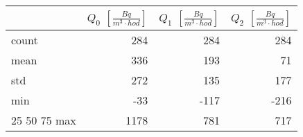 \begin{tabular}{lrrr}
\toprule
{} &  $Q_0$ $\left[\si{\frac{Bq}{m^3\cdot hod}}\right]$ &  $Q_1$ $\left[\si{\frac{Bq}{m^3\cdot hod}}\right]$ &  $Q_2$ $\left[\si{\frac{Bq}{m^3\cdot hod}}\right]$ \\
\midrule
count &                                                284 &                                                284 &                                                284 \\
mean  &                                                336 &                                                193 &                                                 71 \\
std   &                                                272 &                                                135 &                                                177 \\
min   &                                                -33 &                                               -117 &                                               -216 \\
25%
50%
75%
max   &                                               1178 &                                                781 &                                                717 \\
\bottomrule
\end{tabular}
